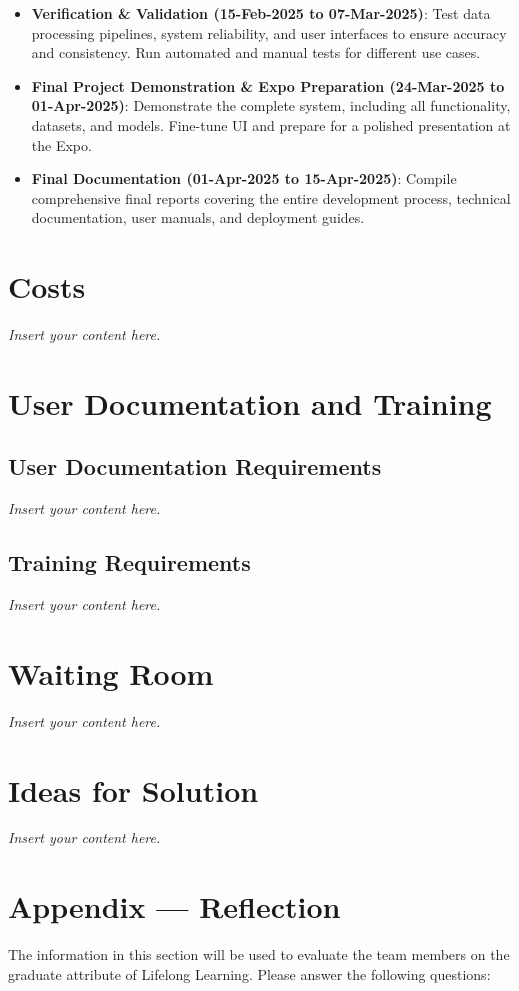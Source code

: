 \documentclass[12pt]{article}
\newcommand{\lips}{\textit{Insert your content here.}}
\begin{document}
\begin{itemize}[leftmargin=2cm]
    \item \textbf{Verification \& Validation (15-Feb-2025 to 07-Mar-2025)}: Test data processing pipelines, system reliability, and user interfaces to ensure accuracy and consistency. Run automated and manual tests for different use cases.
    \item \textbf{Final Project Demonstration \& Expo Preparation (24-Mar-2025 to 01-Apr-2025)}: Demonstrate the complete system, including all functionality, datasets, and models. Fine-tune UI and prepare for a polished presentation at the Expo.
    \item \textbf{Final Documentation (01-Apr-2025 to 15-Apr-2025)}: Compile comprehensive final reports covering the entire development process, technical documentation, user manuals, and deployment guides.
\end{itemize}


\section{Costs}
\lips
\section{User Documentation and Training}
\subsection{User Documentation Requirements}
\lips
\subsection{Training Requirements}
\lips

\section{Waiting Room}
\lips

\section{Ideas for Solution}
\lips

\newpage{}
\section*{Appendix --- Reflection}

The information in this section will be used to evaluate the team members on the
graduate attribute of Lifelong Learning.  Please answer the following questions:
\end{document}
